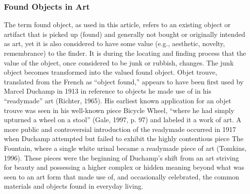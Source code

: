 \documentclass[12pt]{article}
\begin{document}


\subsubsection{Found Objects in Art}
The term found object, as used in this article, refers to an existing object or artifact that is picked up (found) and generally not bought or originally intended as art, yet it is also considered to have some value (e.g., aesthetic, novelty, remembrance) to the finder. It is during the locating and finding process that the value of the object, once considered to be junk or rubbish, changes. The junk object becomes transformed into the valued found object. Objet trouve, translated from the French as “object found,” appears to have been first used by Marcel Duchamp in 1913 in reference to objects he made use of in his “readymade” art (Richter, 1965). His earliest known application for an objet trouve was seen in his well-known piece Bicycle Wheel, “where he had simply upturned a wheel on a stool” (Gale, 1997, p. 97) and labeled it a work of art. A more public and controversial introduction of the readymade occurred in 1917 when Duchamp attempted but failed to exhibit the highly contentious piece The Fountain, where a single white urinal became a readymade piece of art (Tomkins, 1996). These pieces were the beginning of Duchamp’s shift from an art striving for beauty and possessing a higher complex or hidden meaning beyond what was seen to an art form that made use of, and occasionally celebrated, the common materials and objects found in everyday living.
\end{document}
